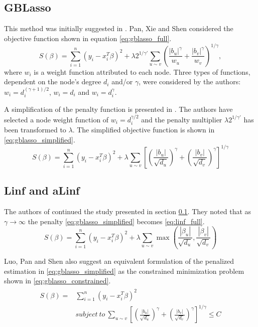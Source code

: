\subsection{GBLasso} \label{sec:gblasso}
This method was initially suggested in \cite{pan2010incorporating}. Pan, Xie and Shen considered the objective function shown in equation \ref{eq:gblasso_full}. 
\begin{equation} \label{eq:gblasso_full}
S(\beta) = \sum_{i=1}^{n} (y_i - x_i^T\beta)^2 + \lambda2^{1/\gamma'}\sum_{u \sim v}\left(\frac{|b_u|^\gamma}{w_u}+\frac{|b_v|^\gamma}{w_v}\right)^{1/\gamma},
\end{equation}
where $w_i$ is a weight function attributed to each node. Three types of functions, dependent on the node's degree $d_i$ and/or $\gamma$, were considered by the authors: $w_i = d_i^{(\gamma+1)/2}$, $w_i = d_i$ and $w_i = d_i^\gamma$.

A simplification of the penalty function is presented in \cite{luo2012two}. The authors have selected a node weight function of $w_i = d_i^{\gamma/2}$ and the penalty multiplier $\lambda2^{1/\gamma'}$ has been transformed to $\lambda$. The simplified objective function is shown in \ref{eq:gblasso_simplified}.
\begin{equation} \label{eq:gblasso_simplified}
S(\beta) = \sum_{i=1}^{n} (y_i - x_i^T\beta)^2 + 
\lambda\sum_{u \sim v}
\left[\left(\frac{|b_u|}{\sqrt{d_u}}\right)^\gamma+
\left(\frac{|b_v|}{\sqrt{d_v}}\right)^\gamma\right]^{1/\gamma}
\end{equation}



\subsection{Linf and aLinf}
The authors of \cite{luo2012two} continued the study presented in section \ref{sec:gblasso}. They noted that as $\gamma\rightarrow\infty$ the penalty \ref{eq:gblasso_simplified} becomes \ref{eq:linf_full}.
\begin{equation} \label{eq:linf_full}
S(\beta) = \sum_{i=1}^{n} (y_i - x_i^T\beta)^2 + 
\lambda\sum_{u \sim v}\max\left(\frac{|\beta_u|}{\sqrt{d_u}},\frac{|\beta_v|}{\sqrt{d_v}}\right)
\end{equation}

Luo, Pan and Shen also suggest an equivalent formulation of the penalized estimation in \ref{eq:gblasso_simplified} as the constrained minimization problem shown in \ref{eq:gblasso_constrained}.
\begin{align} \label{eq:gblasso_constrained}
\begin{split}
S(\beta) = &\sum_{i=1}^{n} (y_i - x_i^T\beta)^2 \\ 
&subject\ to\ \sum_{u \sim v}
\left[\left(\frac{|b_u|}{\sqrt{d_u}}\right)^\gamma+
\left(\frac{|b_v|}{\sqrt{d_v}}\right)^\gamma\right]^{1/\gamma}\leq C
\end{split}
\end{align}

